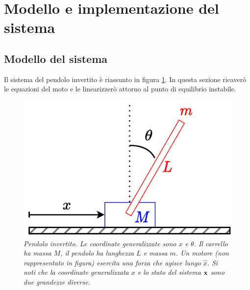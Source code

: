 \section{Modello e implementazione del sistema}\label{sec:modello}
\subsection{Modello del sistema}\label{subsec:modello-del-sistema}
Il sistema del pendolo invertito è riassunto in figura \ref{fig:sistema}.
In questa sezione ricaverò le equazioni del moto e le linearizzerò attorno al punto di equilibrio instabile.

\begin{figure}[h]
    \includegraphics{../assets/sistema.pdf}
  \caption{\emph{Pendolo invertito. Le coordinate generalizzate sono $x$ e $\theta$. Il carrello ha massa $M$,
  il pendolo ha lunghezza $L$ e massa $m$. Un motore (non rappresentato in figura) esercita una forza che agisce
  lungo $\hat x$. Si noti che la coordinate generalizzata $x$ e lo stato del sistema $\bf x$ sono due grandezze diverse.}}
  \label{fig:sistema}
\end{figure}


